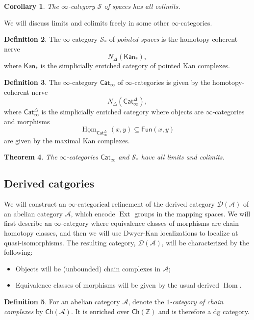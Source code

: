\documentclass[10pt]{amsart}
\newtheorem{thm}{Theorem}[subsection]
\newtheorem{cor}[thm]{Corollary}
\theoremstyle{definition}
\newtheorem{defn}[thm]{Definition}
\theoremstyle{remark}
\theoremstyle{plain}
\theoremstyle{definition}
\theoremstyle{remark}
\newcommand{\Z}{\mathbb{Z}}
\newcommand{\mc}[1]{\mathcal{#1}}
\newcommand{\ms}[1]{\mathsf{#1}}
\newcommand{\ul}[1]{\underline{#1}}
\newcommand{\1}{\mathbf{1}}
\newcommand{\2}{\mathbf{2}}
\newcommand{\3}{\mathbf{3}}
\DeclareMathOperator{\Hom}{Hom}
\DeclareMathOperator{\Ext}{Ext}
\begin{document}
\begin{cor}
    The $\infty$-category $\mc{S}$ of spaces has all colimits.
\end{cor}

We will discuss limits and colimits freely in some other $\infty$-categories.
\begin{defn}
    The $\infty$-category $\mc{S}_*$ of \textit{pointed spaces} is the homotopy-coherent nerve
    \[ N_{\Delta}(\ms{Kan}_*), \]
    where $\ms{Kan}_*$ is the simplicially enriched category of pointed Kan complexes.
\end{defn}

\begin{defn}
    The $\infty$-category $\ms{Cat}_{\infty}$ of $\infty$-categories is given by the homotopy-coherent nerve
    \[ N_{\Delta}(\ms{Cat}_{\infty}^{\Delta}), \]
    where $\ms{Cat}_{\infty}^{\Delta}$ is the simplicially enriched category where objects are $\infty$-categories and morphisms
    \[ \ul{\Hom}_{\ms{Cat}_{\infty}^{\Delta}}(x,y) \subseteq \ms{Fun}(x,y) \]
    are given by the maximal Kan complexes.
\end{defn}

\begin{thm}
    The $\infty$-categories $\ms{Cat}_{\infty}$ and $\mc{S}_*$ have all limits and colimits.
\end{thm}


\subsection{Derived catgories}%
\label{sub:Derived catgories}

We will construct an $\infty$-categorical refinement of the derived category $\mc{D}(\mc{A})$ of an abelian category $\mc{A}$, which encode $\Ext$ groups in the mapping spaces. We will first describe an $\infty$-category where equivalence classes of morphisms are chain homotopy classes, and then we will use Dwyer-Kan localizations to localize at quasi-isomorphisms. The resulting category, $\mc{D}(\mc{A})$, will be characterized by the following:
\begin{itemize}
    \item Objects will be (unbounded) chain complexes in $\mc{A}$;
    \item Equivalence classes of morphisms will be given by the usual derived $\Hom$.
\end{itemize}

\begin{defn}
    For an abelian category $\mc{A}$, denote the \textit{$1$-category of chain complexes} by $\ms{Ch}(\mc{A})$. It is enriched over $\ms{Ch}(\Z)$ and is therefore a dg category.
\end{defn}
\end{document}
